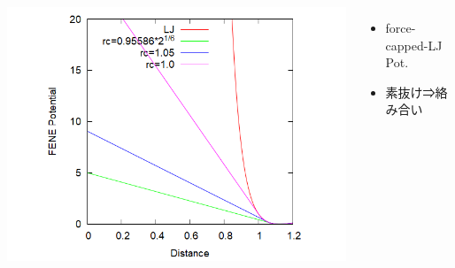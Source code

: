 \documentclass[12pt, dvipdfmx]{beamer}
\begin{document}
\begin{frame}
\begin{columns}[T, onlytextwidth]
\begin{center}
					\includegraphics[width=1.2\textwidth]{Ev_fcLJ.png}
				\end{center}
				\vspace{-3mm}
				\scriptsize
				\begin{itemize}
					\item force-capped-LJ Pot.
					\item 素抜け⇒絡み合い
				\end{itemize}
		\end{columns}
\end{frame}
\end{document}
